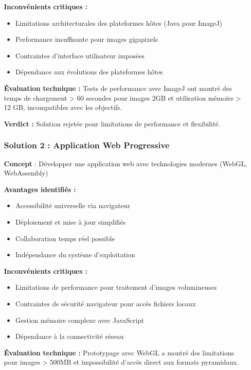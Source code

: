 \documentclass[12pt,a4paper]{report}
\begin{document}
\textbf{Inconvénients critiques :}
\begin{itemize}
\item Limitations architecturales des plateformes hôtes (Java pour ImageJ)
\item Performance insuffisante pour images gigapixels
\item Contraintes d'interface utilisateur imposées
\item Dépendance aux évolutions des plateformes hôtes
\end{itemize}

\textbf{Évaluation technique :} Tests de performance avec ImageJ ont montré des temps de chargement > 60 secondes pour images 2GB et utilisation mémoire > 12 GB, incompatibles avec les objectifs.

\textbf{Verdict :} Solution rejetée pour limitations de performance et flexibilité.

\subsubsection{Solution 2 : Application Web Progressive}

\textbf{Concept} : Développer une application web avec technologies modernes (WebGL, WebAssembly)

\textbf{Avantages identifiés :}
\begin{itemize}
\item Accessibilité universelle via navigateur
\item Déploiement et mise à jour simplifiés
\item Collaboration temps réel possible
\item Indépendance du système d'exploitation
\end{itemize}

\textbf{Inconvénients critiques :}
\begin{itemize}
\item Limitations de performance pour traitement d'images volumineuses
\item Contraintes de sécurité navigateur pour accès fichiers locaux
\item Gestion mémoire complexe avec JavaScript
\item Dépendance à la connectivité réseau
\end{itemize}

\textbf{Évaluation technique :} Prototypage avec WebGL a montré des limitations pour images > 500MB et impossibilité d'accès direct aux formats pyramidaux.
\end{document}
